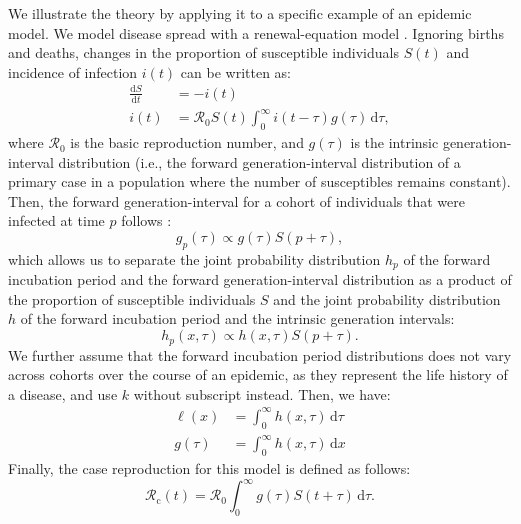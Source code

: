 \documentclass[12pt]{article}
\newcommand{\Rx}[1]{\ensuremath{{\mathcal R}_{#1}}\xspace}
\newcommand{\Ro}{\Rx{0}}
\newcommand{\Rc}{\Rx{\mathrm{c}}}
\newcommand{\dd}[1]{\ensuremath{\, \mathrm{d}#1}}
\newcommand{\dtau}{\dd{\tau}}
\newcommand{\dx}{\dd{x}}
\newcommand{\psymp}{\ensuremath{p}} %
\newcommand{\gdist}{g} %
\newcommand{\idist}{\ell} %
\begin{document}
We illustrate the theory by applying it to a specific example of an epidemic model. 
We model disease spread with a renewal-equation model \citep{heesterbeek1996concept, diekmann2000mathematical, roberts2004modelling, aldis2005integral, roberts2007model, champredon2018equivalence}.
Ignoring births and deaths, changes in the proportion of susceptible individuals $S(t)$ and incidence of infection $i(t)$ can be written as:
\begin{equation}
\begin{aligned}
\frac{\mathrm{d}S}{\mathrm{d}t} &= - i(t)\\
i(t) &= \Ro S(t) \int_0^\infty i(t-\tau) \gdist(\tau) \dtau,
\end{aligned}
\label{eq:renewal}
\end{equation}
where \Ro is the basic reproduction number, and $\gdist(\tau)$ is the intrinsic generation-interval distribution (i.e., the forward generation-interval distribution of a primary case in a population where the number of susceptibles remains constant).
Then, the forward generation-interval for a cohort of individuals that were infected at time $\psymp$ follows \citep{champredon2015intrinsic}:
\begin{equation}
\gdist_\psymp (\tau) \propto \gdist(\tau) S(\psymp + \tau),
\end{equation}
which allows us to separate the joint probability distribution $h_\psymp$ of the forward incubation period and the forward generation-interval distribution as a product of the proportion of susceptible individuals $S$ and the joint probability distribution $h$ of the forward incubation period and the intrinsic generation intervals:
\begin{equation}
h_\psymp (x, \tau) \propto h(x, \tau) S(\psymp + \tau).
\end{equation}
We further assume that the forward incubation period distributions does not vary across cohorts over the course of an epidemic, as they represent the life history of a disease, and use $k$ without subscript instead. 
Then, we have:
\begin{equation}
\begin{aligned}
\idist(x) &= \int_0^\infty h(x, \tau) \dtau\\
\gdist(\tau) &= \int_0^\infty h(x, \tau) \dx
\end{aligned}
\end{equation}
Finally, the case reproduction for this model is defined as follows:
\begin{equation}
\Rc(t) = \Ro \int_0^\infty \gdist(\tau) S(t+\tau) \dtau.
\end{equation}
\end{document}
